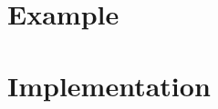 \section{Example}
\label{sec:generalcost-example}


\section{Implementation}
\label{sec:generalcost-implementation}


